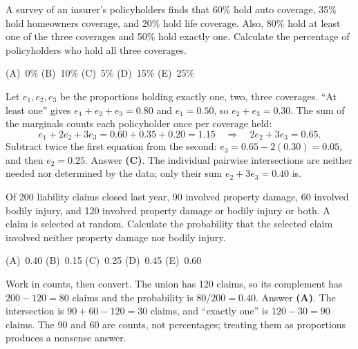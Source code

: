 \begin{example}
A survey of an insurer's policyholders finds that 60\% hold auto coverage, 35\% hold homeowners
coverage, and 20\% hold life coverage. Also, 80\% hold at least one of the three coverages and
50\% hold exactly one.
Calculate the percentage of policyholders who hold all three coverages.
\par\smallskip\noindent (A)~0\% \quad (B)~10\% \quad (C)~5\% \quad (D)~15\% \quad (E)~25\%
\end{example}
\begin{solution}
Let $e_1, e_2, e_3$ be the proportions holding exactly one, two, three coverages. ``At least one''
gives $e_1 + e_2 + e_3 = 0.80$ and $e_1 = 0.50$, so $e_2 + e_3 = 0.30$. The sum of the marginals
counts each policyholder once per coverage held:
\[
e_1 + 2e_2 + 3e_3 = 0.60 + 0.35 + 0.20 = 1.15
 \quad\Longrightarrow\quad 2e_2 + 3e_3 = 0.65.
\]
Subtract twice the first equation from the second: $e_3 = 0.65 - 2(0.30) = 0.05$, and then
$e_2 = 0.25$. Answer \textbf{(C)}. The individual pairwise intersections are neither needed nor
determined by the data; only their sum $e_2 + 3e_3 = 0.40$ is.
\end{solution}

\begin{example}
Of 200 liability claims closed last year, 90 involved property damage, 60 involved bodily injury,
and 120 involved property damage or bodily injury or both. A claim is selected at random.
Calculate the probability that the selected claim involved neither property damage nor bodily
injury.
\par\smallskip\noindent (A)~0.40 \quad (B)~0.15 \quad (C)~0.25 \quad (D)~0.45 \quad (E)~0.60
\end{example}
\begin{solution}
Work in counts, then convert. The union has 120 claims, so its complement has $200 - 120 = 80$
claims and the probability is $80/200 = 0.40$. Answer \textbf{(A)}. The intersection is
$90 + 60 - 120 = 30$ claims, and ``exactly one'' is $120 - 30 = 90$ claims. The 90 and 60 are
counts, not percentages; treating them as proportions produces a nonsense answer.
\end{solution}

